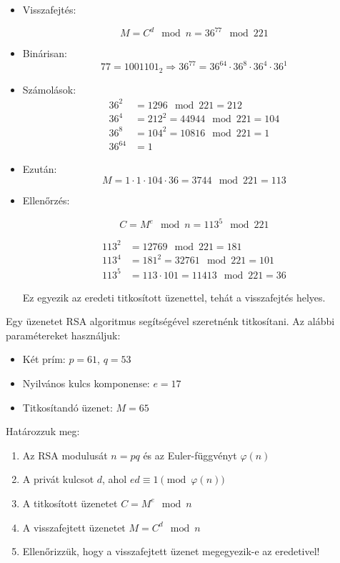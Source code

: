 \begin{solution}
    \begin{itemize}
    
    \item Visszafejtés:

    \[
    M = C^d \mod n = 36^{77} \mod 221
    \]

    \item Binárisan:  
    \[
    77 = 1001101_2 \Rightarrow
    36^{77} = 36^{64} \cdot 36^8 \cdot 36^4 \cdot 36^1
    \]

    \item Számolások:
    \begin{align*}
        36^2 &= 1296 \mod 221 = 212 \\
        36^4 &= 212^2 = 44944 \mod 221 = 104 \\
        36^8 &= 104^2 = 10816 \mod 221 = 1 \\
        36^{64} &= 1
    \end{align*}

    \item Ezután:
    \[
    M = 1 \cdot 1 \cdot 104 \cdot 36 = 3744 \mod 221 = \boxed{113}
    \]

    \item Ellenőrzés:

    \[
    C = M^e \mod n = 113^5 \mod 221
    \]

    \begin{align*}
        113^2 &= 12769 \mod 221 = 181 \\
        113^4 &= 181^2 = 32761 \mod 221 = 101 \\
        113^5 &= 113 \cdot 101 = 11413 \mod 221 = \boxed{36}
    \end{align*}

    Ez egyezik az eredeti titkosított üzenettel, tehát a visszafejtés helyes.
\end{itemize}
\end{solution}
\begin{extraproblem}
Egy üzenetet RSA algoritmus segítségével szeretnénk titkosítani.
Az alábbi paramétereket használjuk:
\begin{itemize}
\item Két prím: $p=61$, $q=53$ 
\item Nyilvános kulcs komponense: $e=17$ 
\item Titkosítandó üzenet: $M=65$ 
\end{itemize}
\noindent Határozzuk meg:
\begin{enumerate}
\item Az RSA modulusát $n=pq$ és az Euler-függvényt $\varphi(n)$ 
\item A privát kulcsot $d$, ahol $ed\equiv1\pmod{\varphi(n)}$ 
\item A titkosított üzenetet $C=M^{e}\mod n$ 
\item A visszafejtett üzenetet $M=C^{d}\mod n$ 
\item Ellenőrizzük, hogy a visszafejtett üzenet megegyezik-e az eredetivel! 
\end{enumerate}
\end{extraproblem}

